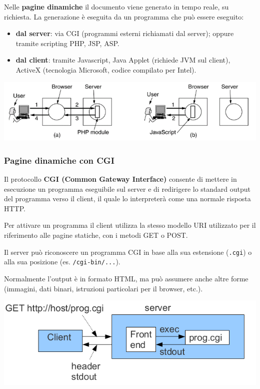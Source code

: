             Nelle \textbf{pagine dinamiche} il documento viene generato in tempo reale, su richiesta. La generazione è eseguita da un programma che può essere eseguito:
            \begin{itemize}
                \item \textbf{dal server}: via CGI (programmi esterni richiamati dal server); oppure tramite scripting PHP, JSP, ASP.
                \item \textbf{dal client}: tramite Javascript, Java Applet (richiede JVM sul client), ActiveX (tecnologia Microsoft, codice compilato per Intel).
            \end{itemize}

            \begin{center}
                \includegraphics[scale=0.38]{chapters/6/assets/schema_q.png}
            \end{center}

        \subsubsection{Pagine dinamiche con CGI}
            Il protocollo \textbf{CGI (Common Gateway Interface)} consente di mettere in esecuzione un programma eseguibile sul server e di redirigere lo standard output del programma verso il client, il quale lo interpreterà come una normale risposta HTTP.
        
            Per attivare un programma il client utilizza la stesso modello URI utilizzato per il riferimento alle pagine statiche, con i metodi GET o POST.
        
            Il server può riconoscere un programma CGI in base alla sua estensione (\verb:.cgi:) o alla sua posizione (es. \verb:/cgi-bin/...:).
        
            Normalmente l'output è in formato HTML, ma può assumere anche altre forme (immagini, dati binari, istruzioni particolari per il browser, etc.).

            \begin{center}
                \includegraphics[scale=0.4]{chapters/6/assets/schema_r.png}
            \end{center}

